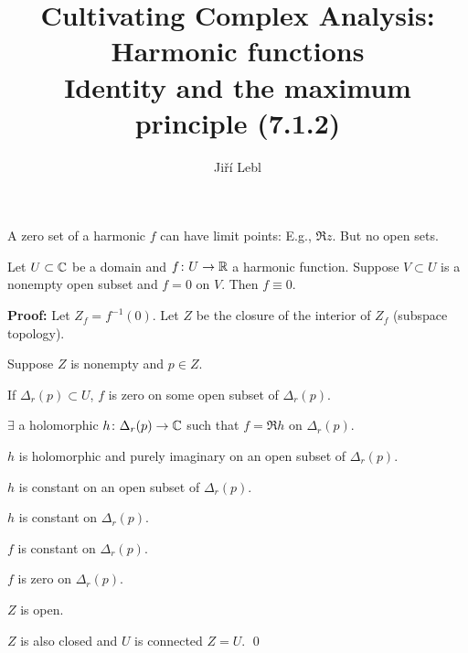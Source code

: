 \documentclass[10pt,aspectratio=169]{beamer}
\author{Ji\v{r}\'i Lebl}
\institute[OSU]{%
Departemento pri Matematiko de Oklahoma {\^S}tata Universitato}
\title{Cultivating Complex Analysis:\\%
Harmonic functions\\%
Identity and the maximum principle (7.1.2)}
\date{}
\begin{document}
\begin{frame}
\titlepage
\end{frame}

\begin{frame}
A zero set of a harmonic $f$ can have limit points: E.g., $\Re z$.
But no open sets.

\pause

\begin{theorem}[Identity]
Let $U \subset {\mathbb{C}}$ be a domain and $f \colon U \to {\mathbb{R}}$ a harmonic function.
Suppose $V \subset U$ is a nonempty open subset and $f = 0$ on $V$.  Then $f
\equiv 0$.
\end{theorem}

\pause
\textbf{Proof:}
Let $Z_f = f^{-1}(0)$.
\pause
\quad
Let $Z$ be the closure of the interior of $Z_f$ (subspace topology).

\medskip
\pause

Suppose $Z$ is nonempty and $p \in Z$.
\pause

If $\Delta_r(p) \subset U$, $f$ is
zero on some open subset of $\Delta_r(p)$.

\pause
\medskip

$\exists$ a holomorphic $h \colon \Delta_r(p) \to {\mathbb{C}}$ such that $f = \Re h$
on $\Delta_r(p)$.

\pause
\thus\quad
$h$ is holomorphic and purely imaginary on an open subset of
$\Delta_r(p)$.

\pause
\thus\quad
$h$ is constant on an open subset of $\Delta_r(p)$.

\pause
\thus\quad
$h$ is constant on $\Delta_r(p)$.

\pause
\thus\quad
$f$ is constant on $\Delta_r(p)$.

\pause
\thus\quad
$f$ is zero on $\Delta_r(p)$.

\pause
\thus\quad
$Z$ is open.

\pause
\medskip

$Z$ is also closed and $U$ is connected \wthus $Z=U$.
\qed
\end{frame}
\end{document}
